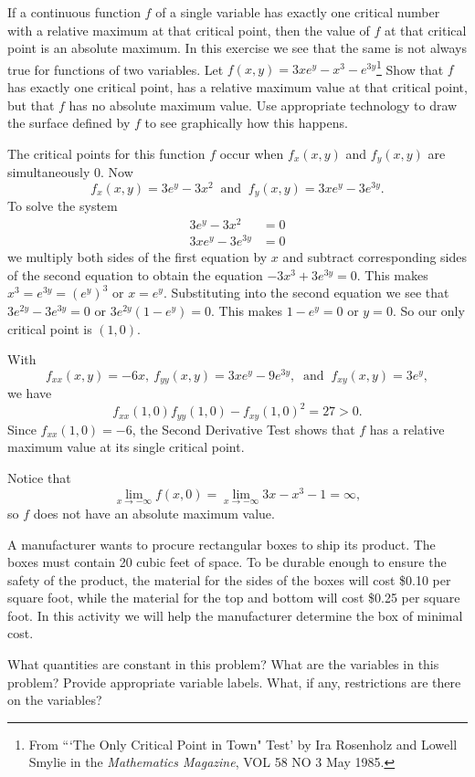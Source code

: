 \begin{exercises}
\item If a continuous function $f$ of a single variable has exactly one critical number with a relative maximum at that critical point, then the value of $f$ at that critical point is an absolute maximum. In this exercise we see that the same is not always true for functions of two variables. Let 
$f(x,y) = 3xe^y-x^3-e^{3y}$\footnote{From ```The Only Critical Point in Town" Test' by Ira Rosenholz and Lowell Smylie in the \emph{Mathematics Magazine}, VOL 58 NO 3 May 1985.} Show that $f$ has exactly one critical point, has a relative maximum value at that critical point, but that $f$ has no absolute maximum value. Use appropriate technology to draw the surface defined by $f$ to see graphically how this happens.  

\begin{exerciseSolution}
The critical points for this function $f$ occur when $f_x(x,y)$ and $f_y(x,y)$ are simultaneously 0. Now
\[f_x(x,y) = 3e^y-3x^2 \ \text{ and } \ f_y(x,y) = 3xe^y-3e^{3y}.\]
To solve the system
\begin{align*}
3e^y-3x^2 &= 0 \\
3xe^y-3e^{3y} &= 0
\end{align*}
we multiply both sides of the first equation by $x$ and subtract corresponding sides of the second equation to obtain the equation $-3x^3+3e^{3y} = 0$. This makes $x^3 = e^{3y} = (e^y)^3$ or $x = e^y$. Substituting into the second equation we see that $3e^{2y} - 3e^{3y} = 0$ or $3e^{2y}(1-e^y) = 0$. This makes $1-e^y=0$ or $y=0$. So our only critical point is $(1,0)$. 

With 
\[f_{xx}(x,y) = -6x, \ f_{yy}(x,y) = 3xe^y-9e^{3y}, \ \text{ and } \ f_{xy}(x,y) = 3e^y,\]
we have 
\[f_{xx}(1,0)f_{yy}(1,0) - f_{xy}(1,0)^2 = 27 > 0.\]
Since $f_{xx}(1,0) = -6$, the Second Derivative Test shows that $f$ has a relative maximum value at its single critical point.

Notice that 
\[\lim_{x \to -\infty} f(x,0) = \lim_{x \to -\infty} 3x-x^3-1 = \infty,\]
so $f$ does not have an absolute maximum value. 
\end{exerciseSolution}



\item A manufacturer wants to procure rectangular boxes to ship its product. The boxes must contain 20 cubic feet of space. To be durable enough to ensure the safety of the product, the material for the sides of the boxes will cost \$0.10 per square foot, while the material for the top and bottom will cost \$0.25 per square foot. In this activity we will help the manufacturer determine the box of minimal cost.
    \ba
    \item What quantities are constant in this problem? What are the variables in this problem? Provide appropriate variable labels. What, if any, restrictions are there on the variables?


\end{exercises}
